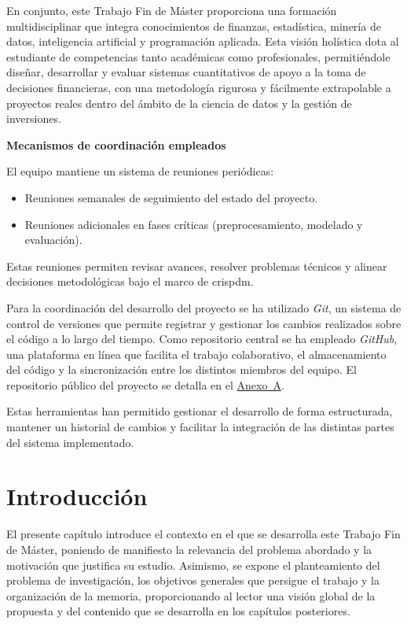 \documentclass[
]{article}
\begin{document}
En conjunto, este Trabajo Fin de Máster proporciona una formación multidisciplinar que integra conocimientos de finanzas, estadística, minería de datos, inteligencia artificial y programación aplicada. Esta visión holística dota al estudiante de competencias tanto académicas como profesionales, permitiéndole diseñar, desarrollar y evaluar sistemas cuantitativos de apoyo a la toma de decisiones financieras, con una metodología rigurosa y fácilmente extrapolable a proyectos reales dentro del ámbito de la ciencia de datos y la gestión de inversiones.


\textbf{Mecanismos de coordinación empleados}

El equipo mantiene un sistema de reuniones periódicas:

\begin{itemize}
	\item Reuniones semanales de seguimiento del estado del proyecto.
	\item Reuniones adicionales en fases críticas (preprocesamiento, modelado y evaluación).
\end{itemize}

Estas reuniones permiten revisar avances, resolver problemas técnicos y
alinear decisiones metodológicas bajo el marco de \gls{crispdm}.

Para la coordinación del desarrollo del proyecto se ha utilizado \emph{Git}, un sistema de control de versiones que permite registrar y gestionar los cambios realizados sobre el código a lo largo del tiempo. Como repositorio central se ha empleado \emph{GitHub}, una plataforma en línea que facilita el trabajo colaborativo, el almacenamiento del código y la sincronización entre los distintos miembros del equipo. El repositorio público del proyecto se detalla en el \hyperlink{anex:codigo}{Anexo~A}.

Estas herramientas han permitido gestionar el desarrollo de forma estructurada, mantener un historial de cambios y facilitar la integración de las distintas partes del sistema implementado.
	
	\newpage
	\section{Introducción}\label{introduccion}
	
	El presente capítulo introduce el contexto en el que se desarrolla este Trabajo Fin de Máster, poniendo de manifiesto la relevancia del problema abordado y la motivación que justifica su estudio. Asimismo, se expone el planteamiento del problema de investigación, los objetivos generales que persigue el trabajo y la organización de la memoria, proporcionando al lector una visión global de la propuesta y del contenido que se desarrolla en los capítulos posteriores.
	
\end{document}
